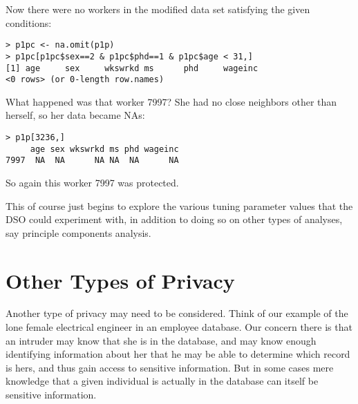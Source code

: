 \documentclass[11pt]{article}
\begin{document}
Now there were no workers in the modified data set satisfying
the given conditions: 

\begin{lstlisting}
> p1pc <- na.omit(p1p) 
> p1pc[p1pc$sex==2 & p1pc$phd==1 & p1pc$age < 31,]
[1] age     sex     wkswrkd ms      phd     wageinc
<0 rows> (or 0-length row.names)
\end{lstlisting}

What happened was that worker 7997? She had no close neighbors other than
herself, so her data became NAs:

\begin{lstlisting}
> p1p[3236,]
     age sex wkswrkd ms phd wageinc
7997  NA  NA      NA NA  NA      NA
\end{lstlisting}

So again this worker 7997 was protected.

This of course just begins to explore the various tuning
parameter values that the DSO could experiment with, in addition to
doing so on other types of analyses, say principle components analysis.





\section{Other Types of Privacy}

Another type of privacy may need to be considered.  Think of our example
of the lone female electrical engineer in an employee database.  Our
concern there is that an intruder may know that she is in the database,
and may know enough identifying information about her that he may be
able to determine which record is hers, and thus gain access to
sensitive information.  But in some cases mere knowledge that a given
individual is actually in the database can itself be sensitive
information.
\end{document}

